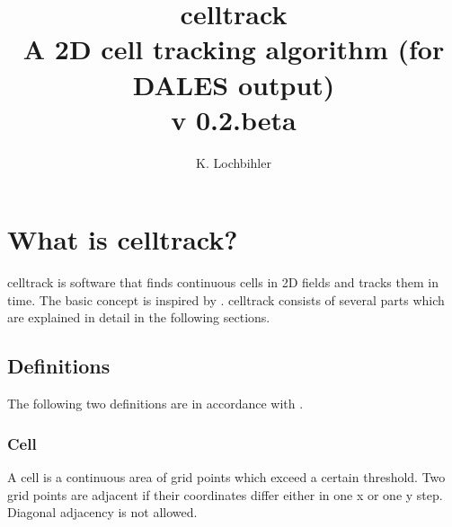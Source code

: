\documentclass{scrartcl}
\title{celltrack\\
	A 2D cell tracking algorithm (for DALES output)\\ \medskip
	v 0.2.beta}
\author{K. Lochbihler}
\begin{document}
	
\maketitle

\section{What is celltrack?}
celltrack is software that finds continuous cells in 2D fields and tracks them in time. The basic concept is inspired by \cite{moseley2013}. celltrack consists of several parts which are explained in detail in the following sections.

\subsection{Definitions}
The following two definitions are in accordance with \cite{moseley2013}.

\subsubsection*{Cell}
A cell is a continuous area of grid points which exceed a certain threshold. Two grid points are adjacent if their coordinates differ either in one x or one y step. Diagonal adjacency is not allowed.
\end{document}
